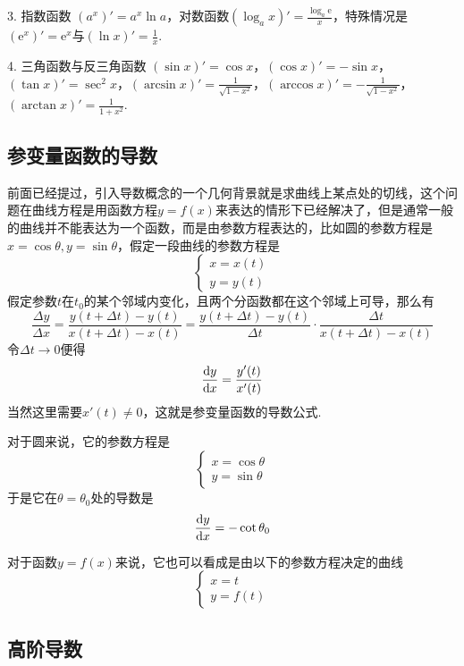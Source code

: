 3. 指数函数 $(a^x)' = a^x \ln{a}$，对数函数$(\log_a x)' = \frac{\log_a \mathrm{e}}{x}$，特殊情况是 $(\mathrm{e}^x)' = \mathrm{e}^x$与$(\ln{x})'=\frac{1}{x}$.

4. 三角函数与反三角函数 $(\sin{x})' = \cos{x}$，$(\cos{x})'=-\sin{x}$，$(\tan{x})'=\sec^2{x}$，$(\arcsin{x})' = \frac{1}{\sqrt{1-x^2}}$，$(\arccos{x})'= - \frac{1}{\sqrt{1-x^2}}$，$(\arctan{x})' = \frac{1}{1+x^2}$.

\subsection{参变量函数的导数}
\label{sec:derivative-of-parametered-function}

前面已经提过，引入导数概念的一个几何背景就是求曲线上某点处的切线，这个问题在曲线方程是用函数方程$y=f(x)$来表达的情形下已经解决了，但是通常一般的曲线并不能表达为一个函数，而是由参数方程表达的，比如圆的参数方程是$x=\cos{\theta},y=\sin{\theta}$，假定一段曲线的参数方程是
\[
  \begin{cases}
    x = x(t) \\
    y = y(t)
  \end{cases}
\]
假定参数$t$在$t_0$的某个邻域内变化，且两个分函数都在这个邻域上可导，那么有
\[ \frac{\Delta y}{\Delta x} = \frac{y(t+\Delta t)-y(t)}{x(t+\Delta t)-x(t)} = \frac{y(t+\Delta t)-y(t)}{\Delta t} \cdot \frac{\Delta t}{x(t+\Delta t)-x(t)} \]
令$\Delta t \to 0$便得
\[ \frac{\mathop{}\!\mathrm{d} y}{\mathop{}\!\mathrm{d} x} = \frac{y'(t)}{x'(t)} \]
当然这里需要$x'(t) \neq 0$，这就是参变量函数的导数公式.

\begin{example}
  对于圆来说，它的参数方程是
  \[
    \begin{cases}
      x=\cos{\theta} \\
      y = \sin{\theta}
    \end{cases}
  \]
  于是它在$\theta=\theta_0$处的导数是
  \[ \frac{\mathop{}\!\mathrm{d} y}{\mathop{}\!\mathrm{d} x} = -\cot{\theta_0} \]
\end{example}

对于函数$y=f(x)$来说，它也可以看成是由以下的参数方程决定的曲线
\[
  \begin{cases}
    x = t \\
    y = f(t)
  \end{cases}
\]

\subsection{高阶导数}
\label{sec:high-level-derivative}

